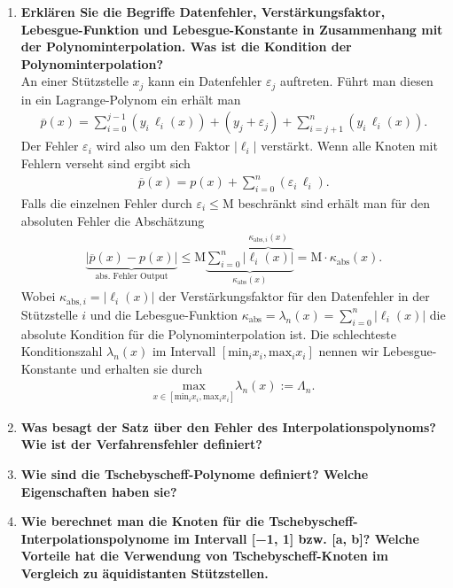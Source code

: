 \begin{enumerate}
		\item \textbf{Erklären Sie die Begriffe Datenfehler, Verstärkungsfaktor, Lebesgue-Funktion und Lebesgue-Konstante in Zusammenhang mit der Polynominterpolation. Was ist die Kondition der Polynominterpolation?} \\
			An einer Stützstelle \(x_j\) kann ein Datenfehler \(\varepsilon_j\) auftreten.
			Führt man diesen in ein Lagrange-Polynom ein erhält man
			\begin{align*}
				\overline{p}(x)=\sum_{i=0}^{j-1}\left( y_i\,\ell_i(x)\right) + (y_j+\varepsilon_j)+\sum_{i=j+1}^{n}\left( y_i\,\ell_i(x)\right).
			\end{align*}
			Der Fehler \(\varepsilon_i\) wird also um den Faktor \(|\ell_i|\) verstärkt.
			Wenn alle Knoten mit Fehlern verseht sind ergibt sich
			\begin{align*}
				\overline{p}(x)=p(x)+\sum_{i=0}^{n}\left( \varepsilon_i\,\ell_i \right) .
			\end{align*}
			Falls die einzelnen Fehler durch \(\varepsilon_i\le\text{M}\) beschränkt sind erhält man für den absoluten Fehler die Abschätzung
			\begin{align*}
				\underbrace{|\overline{p}(x)-p(x)|}_\text{abs. Fehler Output}\leq \text{M}\underbrace{\sum_{i=0}^{n}\overbrace{|\ell_i(x)|}^{\kappa_{\text{abs},i}(x)}}_{\kappa_\text{abs}(x)}
				= \text{M}\cdot\kappa_\text{abs}(x).
			\end{align*}
			Wobei \(\kappa_{\text{abs},i}=|\ell_i(x)|\) der Verstärkungsfaktor für den Datenfehler in der Stützstelle \(i\) und die Lebesgue-Funktion \(\kappa_\text{abs}=\lambda_n(x)=\sum_{i=0}^{n}|\ell_i(x)|\) die absolute Kondition für die Polynominterpolation ist. Die schlechteste Konditionszahl \(\lambda_n(x)\) im Intervall \([\text{min}_ix_i,\text{max}_ix_i]\) nennen wir Lebesgue-Konstante und erhalten sie durch
			\begin{align*}
				\underset{x\in[\text{min}_ix_i,\text{max}_ix_i]}{\text{max}} \lambda_n(x):=\Lambda_n.
			\end{align*}
		\item \textbf{Was besagt der Satz über den Fehler des Interpolationspolynoms? Wie ist der Verfahrensfehler definiert?} \\
		
		\item \textbf{Wie sind die Tschebyscheff-Polynome definiert? Welche Eigenschaften haben sie?} \\
		
		\item \textbf{Wie berechnet man die Knoten für die Tschebyscheff-Interpolationspolynome im Intervall [−1, 1] bzw. [a, b]? Welche Vorteile hat die Verwendung von Tschebyscheff-Knoten im Vergleich zu äquidistanten Stützstellen.} \\
		

\end{enumerate}
